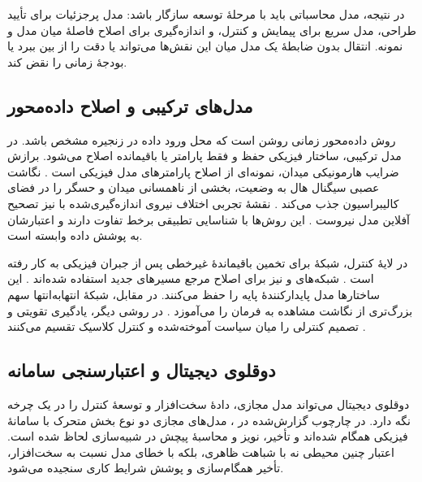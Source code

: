 \label{subsec:design-optimization-summary}
در نتیجه، مدل محاسباتی باید با مرحلهٔ توسعه سازگار باشد: مدل پرجزئیات برای تأیید طراحی، مدل سریع برای پیمایش و کنترل، و اندازه‌گیری برای اصلاح فاصلهٔ میان مدل و نمونه. انتقال بدون ضابطهٔ یک مدل میان این نقش‌ها می‌تواند یا دقت را از بین ببرد یا بودجهٔ زمانی را نقض کند.

\subsection{مدل‌های ترکیبی و اصلاح داده‌محور}
\label{subsec:hybrid-data-driven-modeling}

روش داده‌محور زمانی روشن است که محل ورود داده در زنجیره مشخص باشد. در مدل ترکیبی، ساختار فیزیکی حفظ و فقط پارامتر یا باقیمانده اصلاح می‌شود. برازش ضرایب هارمونیکی میدان، نمونه‌ای از اصلاح پارامترهای مدل فیزیکی است \cite{wangDataDrivenMagneticField2026}. نگاشت عصبی سیگنال هال به وضعیت، بخشی از ناهمسانی میدان و حسگر را در فضای کالیبراسیون جذب می‌کند \cite{yanPassiveMoverPose2025}. نقشهٔ تجربی اختلاف نیروی اندازه‌گیری‌شده با  نیز تصحیح آفلاین مدل نیروست \cite{nakataCompensationFEMBased2026}. این روش‌ها با شناسایی تطبیقی برخط تفاوت دارند و اعتبارشان به پوشش داده وابسته است.

\label{subsec:residual-feedforward-learning}
در لایهٔ کنترل، شبکهٔ  برای تخمین باقیماندهٔ غیرخطی پس از جبران فیزیکی به کار رفته است \cite{liuHybridHarmonicRBFNNBased2025}. شبکه‌های  و  نیز برای اصلاح مرجع مسیرهای جدید استفاده شده‌اند \cite{ouIntelligentFeedforwardCompensation2020,wangLSTMNNbasedReferenceTrajectory2025}. این ساختارها مدل پایدارکنندهٔ پایه را حفظ می‌کنند. در مقابل، شبکهٔ انتهابه‌انتها سهم بزرگ‌تری از نگاشت مشاهده به فرمان را می‌آموزد \cite{hartmannEndtoEndLowLevelNeural2025}. در روشی دیگر، یادگیری تقویتی و  تصمیم کنترلی را میان سیاست آموخته‌شده و کنترل کلاسیک تقسیم می‌کنند \cite{wangRealTimeDeepReinforcement2026d}.

\subsection{دوقلوی دیجیتال و اعتبارسنجی سامانه}
\label{subsec:learning-based-direct-control}
\label{subsec:digital-twin-intelligent-validation}

دوقلوی دیجیتال می‌تواند مدل مجازی، دادهٔ سخت‌افزار و توسعهٔ کنترل را در یک چرخه نگه دارد. در چارچوب گزارش‌شده در \cite{wangDigitalTwinMagnetic2025}، مدل‌های مجازی دو نوع بخش متحرک با سامانهٔ فیزیکی همگام شده‌اند و تأخیر، نویز و محاسبهٔ پیچش در شبیه‌سازی لحاظ شده است. اعتبار چنین محیطی نه با شباهت ظاهری، بلکه با خطای مدل نسبت به سخت‌افزار، تأخیر همگام‌سازی و پوشش شرایط کاری سنجیده می‌شود.

